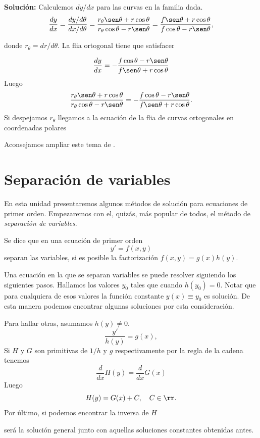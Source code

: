 \noindent\textbf{Solución:} Calculemos $dy/dx$ para las curvas en la familia dada.
\[\frac{dy}{dx}=\frac{dy/d\theta}{dx/d\theta}=\frac{r_{\theta}\sen\theta+r\cos\theta}{r_{\theta}\cos\theta-r\sen\theta}=\frac{f\sen\theta+r\cos\theta}{f\cos\theta-r\sen\theta},\]

donde $r_{\theta}=dr/d\theta$. La flia ortogonal tiene que satisfacer

\[\frac{dy}{dx}=-\frac{f\cos\theta-r\sen\theta}{f\sen\theta+r\cos\theta}\]
Luego
\[\frac{r_{\theta}\sen\theta+r\cos\theta}{r_{\theta}\cos\theta-r\sen\theta}=-\frac{f\cos\theta-r\sen\theta}{f\sen\theta+r\cos\theta}.\]
Si despejamos $r_{\theta}$ llegamos a la ecuación de la flia de curvas ortogonales en coordenadas polares



Aconsejamos ampliar este tema de \cite{simmons_esp}.  



\section{Separación de variables}
En esta unidad presentaremos algunos métodos de solución para ecuaciones de primer orden. Empezaremos con el, quizás, más popular de todos, el método de \emph{separación de variables}.

\begin{definicion}{} Se dice que en una ecuación de primer orden
 \[y'=f(x,y)\]
 separan las variables, si es posible la factorización $f(x,y)=g(x)h(y)$.
\end{definicion}



Una ecuación  en la que se separan variables se puede resolver siguiendo los siguientes pasos. Hallamos los valores $y_0$ tales que cuando $h(y_0)=0$. Notar que para cualquiera de esos valores la función constante $y(x)\equiv y_0$  es solución. De esta manera podemos encontrar algunas soluciones por esta consideración. 

Para hallar otras, asumamos $h(y)\neq 0$. 
\[\frac{y'}{h(y)}=g(x),\]
Si $H$ y $G$ son primitivas de $1/h$ y $g$ respectivamente por la regla de la cadena tenemos
\[\frac{d}{dx}H(y)=\frac{d}{dx}G(x)\]
Luego 
\[H(y)=G(x)+C,\quad C\in\rr.\]
Por último, si podemos encontrar la inversa de $H$

será la solución general junto con aquellas soluciones constantes obtenidas antes.




